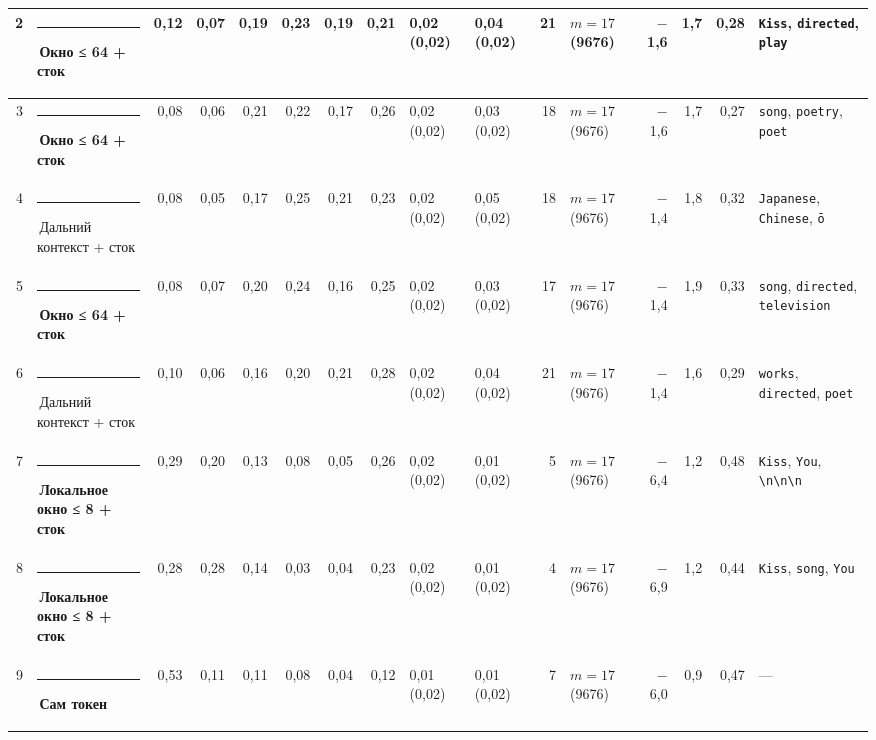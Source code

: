 \documentclass[10pt]{article}
\begin{document}
\begin{minipage}{\linewidth}
\begin{center}
{\begin{tabular}{|r|l|r|r|r|r|r|r|l|l|r|l|r|r|r|l|}
2 & \textcolor[HTML]{EDA100}{\rule{0.62em}{0.62em}}\,\textbf{Окно ≤ 64 + сток} & 0,12 & 0,07 & 0,19 & 0,23 & 0,19 & 0,21 & 0,02 (0,02) & 0,04 (0,02) & 21 & $m{=}17$ (9676) & $-$1,6 & 1,7 & 0,28 & \texttt{\textvisiblespace{}Kiss}, \texttt{\textvisiblespace{}directed}, \texttt{\textvisiblespace{}play} \\ \hline
3 & \textcolor[HTML]{EDA100}{\rule{0.62em}{0.62em}}\,\textbf{Окно ≤ 64 + сток} & 0,08 & 0,06 & 0,21 & 0,22 & 0,17 & 0,26 & 0,02 (0,02) & 0,03 (0,02) & 18 & $m{=}17$ (9676) & $-$1,6 & 1,7 & 0,27 & \texttt{\textvisiblespace{}song}, \texttt{\textvisiblespace{}poetry}, \texttt{\textvisiblespace{}poet} \\ \hline
4 & \textcolor[HTML]{C3C2B7}{\rule{0.62em}{0.62em}}\,Дальний контекст + сток & 0,08 & 0,05 & 0,17 & 0,25 & 0,21 & 0,23 & 0,02 (0,02) & 0,05 (0,02) & 18 & $m{=}17$ (9676) & $-$1,4 & 1,8 & 0,32 & \texttt{\textvisiblespace{}Japanese}, \texttt{\textvisiblespace{}Chinese}, \texttt{ō} \\ \hline
5 & \textcolor[HTML]{EDA100}{\rule{0.62em}{0.62em}}\,\textbf{Окно ≤ 64 + сток} & 0,08 & 0,07 & 0,20 & 0,24 & 0,16 & 0,25 & 0,02 (0,02) & 0,03 (0,02) & 17 & $m{=}17$ (9676) & $-$1,4 & 1,9 & 0,33 & \texttt{\textvisiblespace{}song}, \texttt{\textvisiblespace{}directed}, \texttt{\textvisiblespace{}television} \\ \hline
6 & \textcolor[HTML]{C3C2B7}{\rule{0.62em}{0.62em}}\,Дальний контекст + сток & 0,10 & 0,06 & 0,16 & 0,20 & 0,21 & 0,28 & 0,02 (0,02) & 0,04 (0,02) & 21 & $m{=}17$ (9676) & $-$1,4 & 1,6 & 0,29 & \texttt{\textvisiblespace{}works}, \texttt{\textvisiblespace{}directed}, \texttt{\textvisiblespace{}poet} \\ \hline
7 & \textcolor[HTML]{1BAF7A}{\rule{0.62em}{0.62em}}\,\textbf{Локальное окно ≤ 8 + сток} & 0,29 & 0,20 & 0,13 & 0,08 & 0,05 & 0,26 & 0,02 (0,02) & 0,01 (0,02) & 5 & $m{=}17$ (9676) & $-$6,4 & 1,2 & 0,48 & \texttt{\textvisiblespace{}Kiss}, \texttt{\textvisiblespace{}You}, \texttt{\textvisiblespace{}\textbackslash{}n\textbackslash{}n\textbackslash{}n} \\ \hline
8 & \textcolor[HTML]{1BAF7A}{\rule{0.62em}{0.62em}}\,\textbf{Локальное окно ≤ 8 + сток} & 0,28 & 0,28 & 0,14 & 0,03 & 0,04 & 0,23 & 0,02 (0,02) & 0,01 (0,02) & 4 & $m{=}17$ (9676) & $-$6,9 & 1,2 & 0,44 & \texttt{\textvisiblespace{}Kiss}, \texttt{\textvisiblespace{}song}, \texttt{\textvisiblespace{}You} \\ \hline
9 & \textcolor[HTML]{2A78D6}{\rule{0.62em}{0.62em}}\,\textbf{Сам токен} & 0,53 & 0,11 & 0,11 & 0,08 & 0,04 & 0,12 & 0,01 (0,02) & 0,01 (0,02) & 7 & $m{=}17$ (9676) & $-$6,0 & 0,9 & 0,47 & — \\ \hline

\end{tabular}}
\end{center}
\end{minipage}
\end{document}
